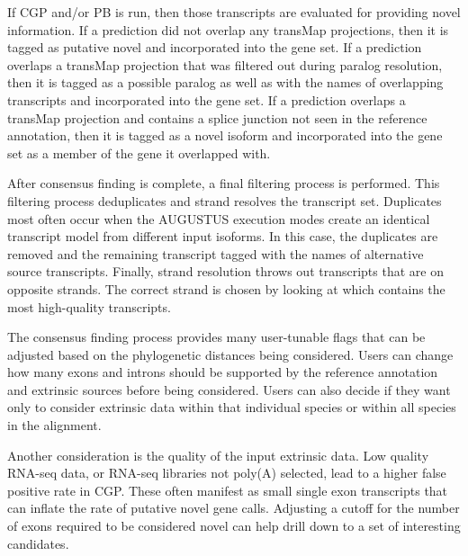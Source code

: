 	If CGP and/or PB is run, then those transcripts are evaluated for providing novel information. If a prediction did not overlap any transMap projections, then it is tagged as putative novel and incorporated into the gene set. If a prediction overlaps a transMap projection that was filtered out during paralog resolution, then it is tagged as a possible paralog as well as with the names of overlapping transcripts and incorporated into the gene set. If a prediction overlaps a transMap projection and contains a splice junction not seen in the reference annotation, then it is tagged as a novel isoform and incorporated into the gene set as a member of the gene it overlapped with.
  
	After consensus finding is complete, a final filtering process is performed. This filtering process deduplicates and strand resolves the transcript set. Duplicates most often occur when the AUGUSTUS execution modes create an identical transcript model from different input isoforms. In this case, the duplicates are removed and the remaining transcript tagged with the names of alternative source transcripts. Finally, strand resolution throws out transcripts that are on opposite strands. The correct strand is chosen by looking at which contains the most high-quality transcripts.
  
	The consensus finding process provides many user-tunable flags that can be adjusted based on the phylogenetic distances being considered. Users can change how many exons and introns should be supported by the reference annotation and extrinsic sources before being considered. Users can also decide if they want only to consider extrinsic data within that individual species or within all species in the alignment. 

Another consideration is the quality of the input extrinsic data. Low quality RNA-seq data, or RNA-seq libraries not poly(A) selected, lead to a higher false positive rate in CGP. These often manifest as small single exon transcripts that can inflate the rate of putative novel gene calls. Adjusting a cutoff for the number of exons required to be considered novel can help drill down to a set of interesting candidates.

